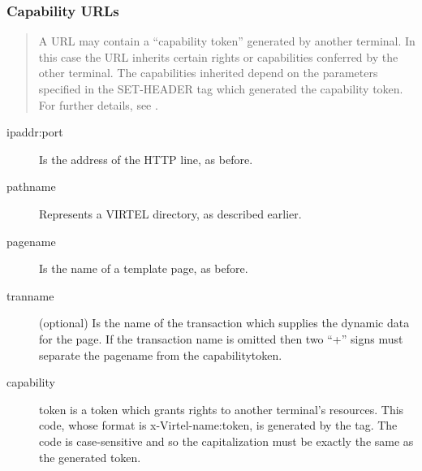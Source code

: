 \documentclass[letterpaper,10pt,english]{sphinxmanual}
\begin{document}


\subsubsection{Capability URLs}
\label{\detokenize{User_Guide:capability-urls}}\begin{quote}

A URL may contain a “capability token” generated by another terminal. In this case the URL inherits certain rights or capabilities conferred by the other terminal. The capabilities inherited depend on the parameters specified in the SET-HEADER tag which generated the capability token. For further details, see {\hyperref[\detokenize{User_Guide:v457ug-capability-tokens}]{}}.
\end{quote}

\begin{sphinxVerbatim}[commandchars=\\\{\}]
\end{sphinxVerbatim}
\begin{description}
\item[{ipaddr:port}] \leavevmode
Is the address of the HTTP line, as before.

\item[{pathname}] \leavevmode
Represents a VIRTEL directory, as described earlier.

\item[{pagename}] \leavevmode
Is the name of a template page, as before.

\item[{tranname}] \leavevmode
(optional) Is the name of the transaction which supplies the dynamic data for the page. If the transaction name is omitted then two “+” signs must separate the pagename from the capabilitytoken.

\item[{capability}] \leavevmode
token is a token which grants rights to another terminal’s
resources. This code, whose format is x-Virtel-name:token, is
generated by the {\hyperref[\detokenize{User_Guide:v457ug-set-header}]{}} tag.
The code is case-sensitive and so the capitalization must be exactly
the same as the generated token.

\end{description}
\end{document}

